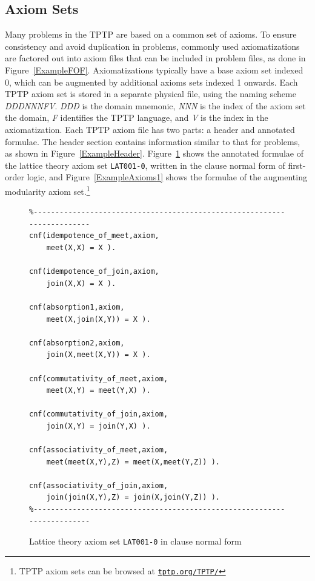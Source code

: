 \documentclass[runningheads]{llncs}
\begin{document}
\subsection{Axiom Sets}
\label{AxiomsSets}

Many problems in the TPTP are based on a common set of axioms.
To ensure consistency and avoid duplication in problems, commonly used axiomatizations are
factored out into axiom files that can be included in problem files, as done in
Figure~\ref{ExampleFOF}.
Axiomatizations typically have a base axiom set indexed 0, which can be augmented by additional
axioms sets indexed 1 onwards.
Each TPTP axiom set is stored in a separate physical file, using the naming scheme
{\em DDDNNNFV}.
{\em DDD} is the domain mnemonic, {\em NNN} is the index of the axiom set the domain,
{\em F} identifies the TPTP language, and {\em V} is the index in the axiomatization.
Each TPTP axiom file has two parts: a header and annotated formulae.
The header section contains information similar to that for problems, as shown in 
Figure~\ref{ExampleHeader}.
Figure~\ref{ExampleAxioms0} shows the annotated formulae of the lattice theory axiom set 
{\tt LAT001-0}, written in the clause normal form of first-order logic, and 
Figure~\ref{ExampleAxioms1} shows the formulae of the augmenting modularity axiom set.\footnote{%
TPTP axiom sets can be browsed at \href{https://tptp.org/TPTP/}{{\tt tptp.org/TPTP/}}}

\begin{figure}[tb]
\centering
{\footnotesize
{\setlength{\baselineskip}{3mm}
\begin{verbatim}
%------------------------------------------------------------------------
cnf(idempotence_of_meet,axiom,
    meet(X,X) = X ).

cnf(idempotence_of_join,axiom,
    join(X,X) = X ).

cnf(absorption1,axiom,
    meet(X,join(X,Y)) = X ).

cnf(absorption2,axiom,
    join(X,meet(X,Y)) = X ).

cnf(commutativity_of_meet,axiom,
    meet(X,Y) = meet(Y,X) ).

cnf(commutativity_of_join,axiom,
    join(X,Y) = join(Y,X) ).

cnf(associativity_of_meet,axiom,
    meet(meet(X,Y),Z) = meet(X,meet(Y,Z)) ).

cnf(associativity_of_join,axiom,
    join(join(X,Y),Z) = join(X,join(Y,Z)) ).
%------------------------------------------------------------------------
\end{verbatim}
}}
\caption{Lattice theory axiom set {\tt LAT001-0} in clause normal form}
\label{ExampleAxioms0}
\end{figure}
\end{document}
